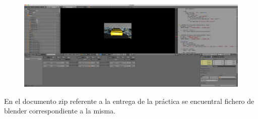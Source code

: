 \documentclass[10pt]{article}
\begin{document}
\begin{figure}[H]
	\begin{center}
	 		\includegraphics[width = 1.00\textwidth]{Imagenes/p6-img5}
	\end{center} 
\end{figure}


En el documento zip referente a la entrega de la práctica se encuentral fichero de blender correspondiente a la misma.\\
\end{document}
